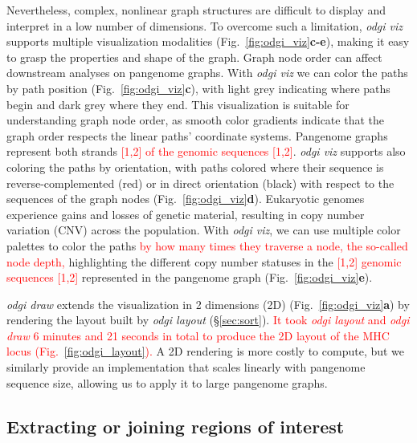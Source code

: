 \documentclass{bioinfo}
\newcommand{\REVIEWED}[1]{{\textcolor{Red}{#1}}}
\begin{document}
Nevertheless, complex, nonlinear graph structures are difficult to display and interpret in a low number of dimensions.
To overcome such a limitation, \textit{odgi viz} supports multiple visualization modalities (Fig.~\ref{fig:odgi_viz}\textbf{c-e}), making it easy to grasp the properties and shape of the graph.
Graph node order can affect downstream analyses on pangenome graphs.
With \textit{odgi viz} we can color the paths by path position (Fig.~\ref{fig:odgi_viz}\textbf{c}), with light grey indicating where paths begin and dark grey where they end.
This visualization is suitable for understanding graph node order, as smooth color gradients indicate that the graph order respects the linear paths' coordinate systems.
Pangenome graphs represent both strands \REVIEWED{[1,2] of the genomic sequences [1,2]}.
\textit{odgi viz} supports also coloring the paths by orientation, with paths colored where their sequence is reverse-complemented (red) or in direct orientation (black) with respect to the sequences of the graph nodes (Fig.~\ref{fig:odgi_viz}\textbf{d}).
Eukaryotic genomes experience gains and losses of genetic material, resulting in copy number variation (CNV) across the population.
With \textit{odgi viz}, we can use multiple color palettes to color the paths \REVIEWED{by how many times they traverse a node, the so-called node depth,} highlighting the different copy number statuses in the \REVIEWED{[1,2] genomic sequences [1,2]} represented in the pangenome graph (Fig.~\ref{fig:odgi_viz}\textbf{e}).

\textit{odgi draw} extends the visualization in 2 dimensions (2D)  (Fig.~\ref{fig:odgi_viz}\textbf{a}) by rendering the layout built by \textit{odgi layout} (\S\ref{sec:sort}). \REVIEWED{It took \textit{odgi layout} and \textit{odgi draw} 6 minutes and 21 seconds in total to produce the 2D layout of the MHC locus (Fig.~\ref{fig:odgi_layout}).}
A 2D rendering is more costly to compute, but we similarly provide an implementation that scales linearly with pangenome sequence size, allowing us to apply it to large pangenome graphs.


\subsection{Extracting or joining regions of interest}
\label{sec:extract}
\end{document}
